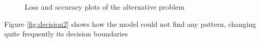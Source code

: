 \documentclass[compsoc]{IEEEtran}
\begin{document}
\begin{figure}%
    \centering
    \qquad
    \caption{Loss and accuracy plots of the alternative problem}%
    \label{fig:losacc}%
\end{figure}

Figure \ref{fig:decision2} shows how the model could not find any pattern, changing quite frequently its decision boundaries
\end{document}

